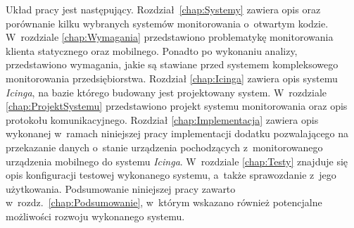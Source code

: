 Układ pracy jest następujący. Rozdział~\ref{chap:Systemy} zawiera opis
oraz porównanie kilku wybranych systemów monitorowania o~otwartym
kodzie. W~rozdziale \ref{chap:Wymagania} przedstawiono problematykę
monitorowania klienta statycznego oraz mobilnego. Ponadto po wykonaniu
analizy, przedstawiono wymagania, jakie są stawiane przed systemem
kompleksowego monitorowania przedsiębiorstwa. Rozdział
\ref{chap:Icinga} zawiera opis systemu {\em Icinga}, na bazie którego
budowany jest projektowany system. W~rozdziale
\ref{chap:ProjektSystemu} przedstawiono projekt systemu monitorowania
oraz opis protokołu komunikacyjnego. Rozdział \ref{chap:Implementacja}
zawiera opis wykonanej w~ramach niniejszej pracy implementacji dodatku
pozwalającego na przekazanie danych o~stanie urządzenia pochodzących
z~monitorowanego urządzenia mobilnego do systemu {\em Icinga}. W~rozdziale
\ref{chap:Testy} znajduje się opis konfiguracji testowej wykonanego
systemu, a~także sprawozdanie z~jego użytkowania. Podsumowanie
niniejszej pracy zawarto w~rozdz.~\ref{chap:Podsumowanie}, w~którym
wskazano również potencjalne możliwości rozwoju wykonanego systemu.
